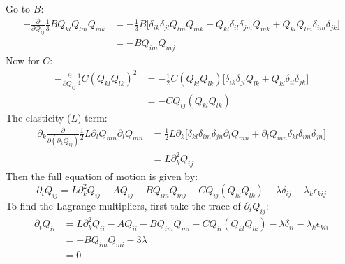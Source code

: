 \documentclass[reqno]{article}
\begin{document}
	Go to $B$:
	\begin{equation}
	\begin{split}
		-\frac{\partial}{\partial Q_{ij}}
		\tfrac13 B Q_{kl} Q_{lm} Q_{mk}
		&= -\tfrac13 B \bigl[ 
		\delta_{ik} \delta_{jl} Q_{lm} Q_{mk}
		+ Q_{kl} \delta_{il} \delta_{jm} Q_{mk}
		+ Q_{kl} Q_{lm} \delta_{im} \delta_{jk}
		\bigr] \\
		&= -B Q_{im} Q_{mj}
	\end{split}
	\end{equation}
	Now for $C$:
	\begin{equation}
	\begin{split}
		-\frac{\partial}{\partial Q_{ij}}
		\tfrac14 C (Q_{kl} Q_{lk})^2
		&= -\tfrac12 C (Q_{kl} Q_{lk})
		\bigl[
		\delta_{ik} \delta_{jl} Q_{lk}
		+ Q_{kl} \delta_{il} \delta_{jk}
		\bigr] \\
		&= -C Q_{ij} (Q_{kl} Q_{lk})
	\end{split}
	\end{equation}
	The elasticity ($L$) term:
	\begin{equation}
	\begin{split}
		\partial_k \frac{\partial}{\partial (\partial_k Q_{ij})}
		\tfrac12 L \partial_l Q_{mn} \partial_l Q_{mn}
		&= \tfrac12 L \partial_k \bigl[
		\delta_{kl} \delta_{im} \delta_{jn} \partial_l Q_{mn}
		+ \partial_l Q_{mn} \delta_{kl} \delta_{im} \delta_{jn}
		\bigr] \\
		&= L \partial_k^2 Q_{ij}
	\end{split}
	\end{equation}
	Then the full equation of motion is given by:
	\begin{equation}
		\partial_t Q_{ij}
		= L \partial_k^2 Q_{ij}
		- A Q_{ij}
		- B Q_{im} Q_{mj}
		- C Q_{ij} (Q_{kl} Q_{lk})
        - \lambda \delta_{ij}
        - \lambda_k \epsilon_{kij}
	\end{equation}
    To find the Lagrange multipliers, first take the trace of $\partial_t Q_{ij}$:
    \begin{equation}
        \begin{split}
            \partial_t Q_{ii}
            &=
            L \partial_k^2 Q_{ii}
		    - A Q_{ii}
		    - B Q_{im} Q_{mi}
		    - C Q_{ii} (Q_{kl} Q_{lk})
            - \lambda \delta_{ii}
            - \lambda_k \epsilon_{kii} \\
            &=
            - B Q_{im} Q_{mi}
            - 3\lambda \\
            &=
            0
        \end{split}
    \end{equation}
\end{document}
